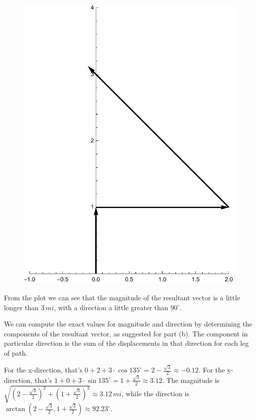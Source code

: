 \documentclass{amsart}
\begin{document}
\begin{figure}[h]
\includegraphics[scale=0.32]{1-16}
\end{figure}

From the plot we can see that the magnitude of the resultant vector is a little longer than $3\,mi$,
with a direction a little greater than $90^\circ$.

We can compute the exact values for magnitude and direction by determining the components of the resultant vector, as suggested for part (b).
The component in particular direction is the sum of the displacements in that direction for each leg of path.

For the x-direction, that's $0 + 2 + 3 \cdot \cos 135^\circ = 2 - \frac{\sqrt{3}}{2} \approx -0.12$.
For the y-direction, that's $1 + 0 + 3 \cdot \sin 135^\circ = 1 + \frac{\sqrt{3}}{2} \approx 3.12$.
The magnitude is $\sqrt{(2 - \frac{\sqrt{3}}{2})^2 + (1 + \frac{\sqrt{3}}{2})^2} \approx 3.12\,mi$,
while the direction is $\arctan(2 - \frac{\sqrt{3}}{2}, 1 + \frac{\sqrt{3}}{2}) \approx 92.23^\circ$.
\end{document}
